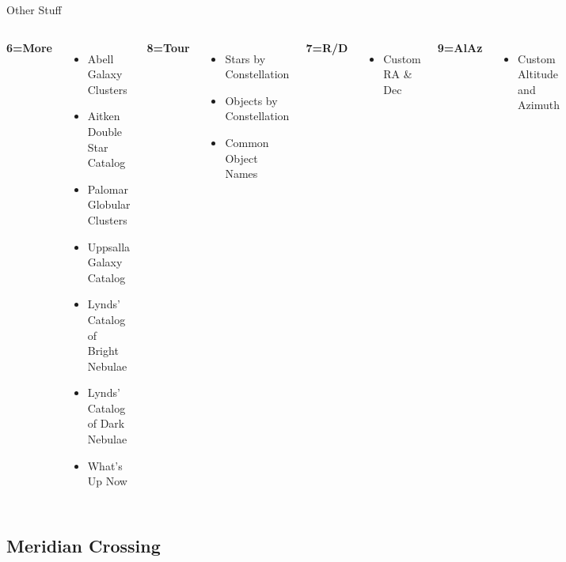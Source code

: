 \begin{frame}[t]{Other Stuff}
\large
\begin{columns}[T]
  \textbf{6=More}
    \begin{itemize}
    \item Abell Galaxy Clusters
    \item Aitken Double Star Catalog
    \item Palomar Globular Clusters
    \item Uppsalla Galaxy Catalog
    \item Lynds’ Catalog of Bright Nebulae
    \item Lynds’ Catalog of Dark Nebulae
    \item What’s Up Now
    \end{itemize}

  \textbf{8=Tour}
    \begin{itemize}
    \item Stars by Constellation
    \item Objects by Constellation
    \item Common Object Names
    \end{itemize}

  \textbf{7=R/D}
    \begin{itemize}
    \item Custom RA \& Dec
    \end{itemize}

  \textbf{9=AlAz}
    \begin{itemize}
    \item Custom Altitude and Azimuth
    \end{itemize}
\end{columns}
\end{frame}

\subsection{Meridian Crossing}

